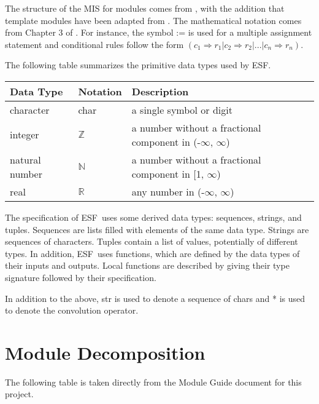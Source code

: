 \documentclass[12pt, titlepage]{article}
\newcommand{\ProjectName}{ESF}
\begin{document}
The structure of the MIS for modules comes from \citet{HoffmanAndStrooper1995},
with the addition that template modules have been adapted from
\cite{GhezziEtAl2003}.  The mathematical notation comes from Chapter 3 of
\citet{HoffmanAndStrooper1995}.  For instance, the symbol := is used for a
multiple assignment statement and conditional rules follow the form $(c_1
\Rightarrow r_1 | c_2 \Rightarrow r_2 | ... | c_n \Rightarrow r_n )$.

The following table summarizes the primitive data types used by \ProjectName. 

\begin{center}
\renewcommand{\arraystretch}{1.2}
\noindent 
\begin{tabular}{l l p{7.5cm}} 
\toprule 
\textbf{Data Type} & \textbf{Notation} & \textbf{Description}\\ 
\midrule
character & char & a single symbol or digit\\
integer & $\mathbb{Z}$ & a number without a fractional component in (-$\infty$, $\infty$) \\
natural number & $\mathbb{N}$ & a number without a fractional component in [1, $\infty$) \\
real & $\mathbb{R}$ & any number in (-$\infty$, $\infty$)\\
\bottomrule
\end{tabular} 
\end{center}

\noindent
The specification of \ProjectName \ uses some derived data types: sequences, strings, and
tuples. Sequences are lists filled with elements of the same data type. Strings
are sequences of characters. Tuples contain a list of values, potentially of
different types. In addition, \ProjectName \ uses functions, which
are defined by the data types of their inputs and outputs. Local functions are
described by giving their type signature followed by their specification.

In addition to the above, str is used to denote a sequence of chars and * is used to denote the convolution operator.

\section{Module Decomposition}

The following table is taken directly from the Module Guide document for this project.
\end{document}
